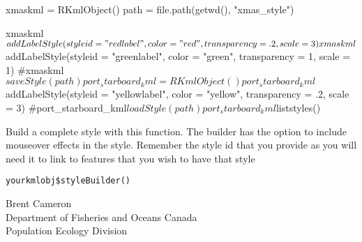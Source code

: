 \documentclass[a4paper]{book}
\begin{document}
%
\begin{Examples}
\begin{ExampleCode}

xmaskml = RKmlObject()
path = file.path(getwd(), "xmas_style")

xmaskml$addLabelStyle(styleid = "redlabel", color = "red", transparency = .2, scale = 3)
xmaskml$addLabelStyle(styleid = "greenlabel", color = "green", transparency = 1, scale = 1)
#xmaskml$saveStyle(path)


port_starboard_kml = RKmlObject()
port_starboard_kml$addLabelStyle(styleid = "yellowlabel", color = "yellow", transparency = .2, scale = 3)
#port_starboard_kml$loadStyle(path) 
port_starboard_kml$liststyles()

\end{ExampleCode}
\end{Examples}
%
\begin{Description}\relax
Build a complete style with this function. The builder has the option to include mouseover effects in the style. Remember the style id that you provide as you will need it to link to features that you wish to have that style
\end{Description}
%
\begin{Usage}
\begin{verbatim}
yourkmlobj$styleBuilder()
\end{verbatim}
\end{Usage}
%
\begin{Author}\relax
Brent Cameron\\{}
Department of Fisheries and Oceans Canada\\{}
Population Ecology Division
\end{Author}
%
\begin{Examples}
\end{Examples}
\end{document}
